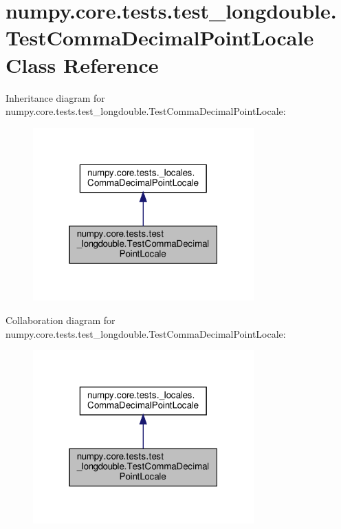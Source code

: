 \hypertarget{classnumpy_1_1core_1_1tests_1_1test__longdouble_1_1TestCommaDecimalPointLocale}{}\section{numpy.\+core.\+tests.\+test\+\_\+longdouble.\+Test\+Comma\+Decimal\+Point\+Locale Class Reference}
\label{classnumpy_1_1core_1_1tests_1_1test__longdouble_1_1TestCommaDecimalPointLocale}


Inheritance diagram for numpy.\+core.\+tests.\+test\+\_\+longdouble.\+Test\+Comma\+Decimal\+Point\+Locale\+:
\nopagebreak
\begin{figure}[H]
\begin{center}
\leavevmode
\includegraphics[width=241pt]{classnumpy_1_1core_1_1tests_1_1test__longdouble_1_1TestCommaDecimalPointLocale__inherit__graph}
\end{center}
\end{figure}


Collaboration diagram for numpy.\+core.\+tests.\+test\+\_\+longdouble.\+Test\+Comma\+Decimal\+Point\+Locale\+:
\nopagebreak
\begin{figure}[H]
\begin{center}
\leavevmode
\includegraphics[width=241pt]{classnumpy_1_1core_1_1tests_1_1test__longdouble_1_1TestCommaDecimalPointLocale__coll__graph}
\end{center}
\end{figure}
